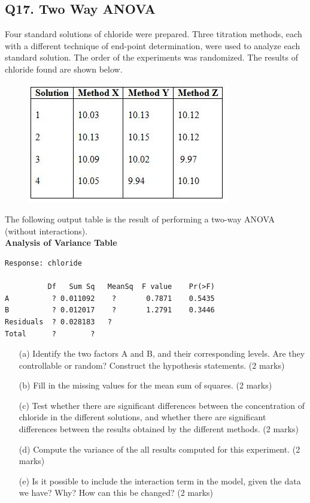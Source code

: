 \documentclass[a4paper,12pt]{article}
\begin{document}
\subsection*{Q17. Two Way ANOVA } %
Four standard solutions of chloride were prepared. Three titration methods, each with a different technique of end-point determination, were used to analyze each standard solution. The order of the experiments was randomized. The results of chloride found are shown below.
\begin{figure}[h!]
\centering
\includegraphics[width=0.5\linewidth]{images/TwoWayANOVAdata}

\end{figure}
\noindent The following output table is the result of performing a two-way ANOVA (without
interactions). \\

\bigskip
\noindent \textbf{Analysis of Variance Table}
\begin{framed}
	{
		\Large
\begin{verbatim}
Response: chloride

          Df   Sum Sq   MeanSq  F value    Pr(>F)
A          ? 0.011092 	 ?       0.7871    0.5435
B          ? 0.012017 	 ?       1.2791    0.3446
Residuals  ? 0.028183   ?      
Total      ?        ?              
\end{verbatim}
}
\end{framed}

\begin{itemize}
\item[(a)]	Identify the two factors A and B, and their corresponding levels. Are they controllable or random? Construct the hypothesis statements.
(2 marks)
\item[(b)]	 Fill in the missing values for the mean sum of squares.
(2 marks)
\item[(c)]	Test whether there are significant differences between the concentration of chloride in the different solutions, and whether there are significant differences between the results obtained by the different methods.
(2 marks)
\item[(d)]	Compute the variance of the all results computed for this experiment.
(2 marks)
\item[(e)]	Is it possible to include the interaction term in the model, given the data we have? Why? How can this be changed?
(2 marks)
\end{itemize}
\end{document}
